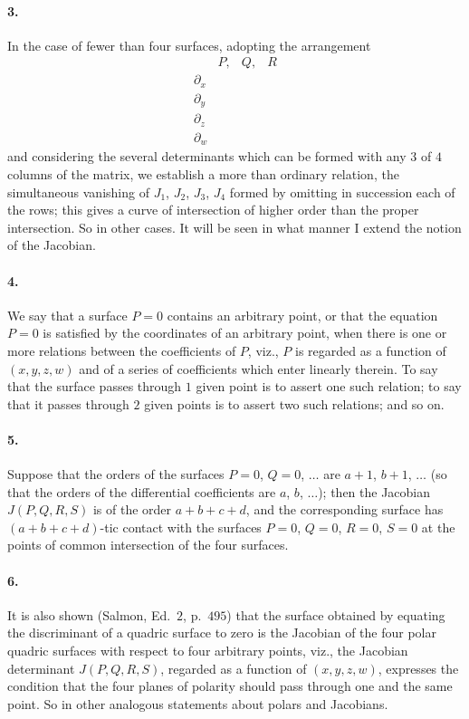\documentclass[11pt,a4paper]{article}
\begin{document}
\paragraph{3.}
In the case of fewer than four surfaces, adopting the arrangement
\[
\begin{array}{c|ccc}
 & P, & Q, & R \\\hline
\partial_x & & & \\
\partial_y & & & \\
\partial_z & & & \\
\partial_w & & &
\end{array}
\]
and considering the several determinants which can be formed with any $3$ of $4$ columns
of the matrix, we establish a more than ordinary relation, the simultaneous vanishing
of $J_1$, $J_2$, $J_3$, $J_4$ formed by omitting in succession each of the rows; this
gives a curve of intersection of higher order than the proper intersection. So in other
cases. It will be seen in what manner I extend the notion of the Jacobian.

\paragraph{4.}
We say that a surface $P = 0$ contains an arbitrary point, or that the equation
$P = 0$ is satisfied by the coordinates of an arbitrary point, when there is one or more
relations between the coefficients of $P$, viz., $P$ is regarded as a function of
$(x, y, z, w)$ and of a series of coefficients which enter linearly therein. To say that
the surface passes through $1$ given point is to assert one such relation; to say that
it passes through $2$ given points is to assert two such relations; and so on.

\paragraph{5.}
Suppose that the orders of the surfaces $P = 0$, $Q = 0$, $\ldots$ are $a + 1$, $b + 1$,
$\ldots$ (so that the orders of the differential coefficients are $a$, $b$, $\ldots$);
then the Jacobian $J(P, Q, R, S)$ is of the order $a + b + c + d$, and the corresponding
surface has $(a + b + c + d)$-tic contact with the surfaces $P = 0$, $Q = 0$, $R = 0$,
$S = 0$ at the points of common intersection of the four surfaces.

\paragraph{6.}
It is also shown (Salmon, Ed.\ $2$, p.\ $495$) that the surface obtained by equating the
discriminant of a quadric surface to zero is the Jacobian of the four polar quadric
surfaces with respect to four arbitrary points, viz., the Jacobian determinant
$J(P, Q, R, S)$, regarded as a function of $(x, y, z, w)$, expresses the condition that
the four planes of polarity should pass through one and the same point. So in other
analogous statements about polars and Jacobians.
\end{document}
